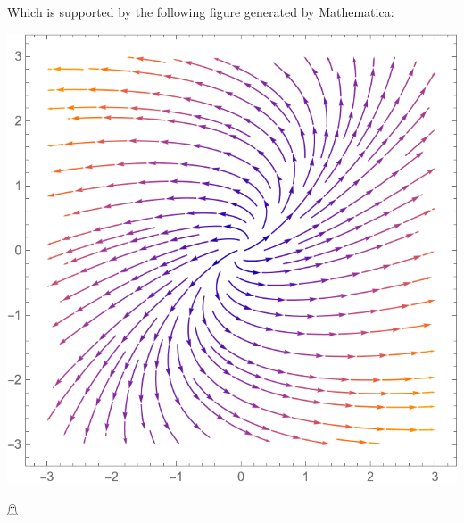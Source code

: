 \documentclass{article}
\begin{document}
\begin{itemize}
\begin{itemize}
\begin{center}
        \end{center}
        Which is supported by the following figure generated by Mathematica:
        \begin{center}
            \includegraphics[scale = 0.5]{prob1b_stream.png}
        \end{center}
        \hfill $\mathghost$



\end{itemize}
\end{itemize}
\end{document}
